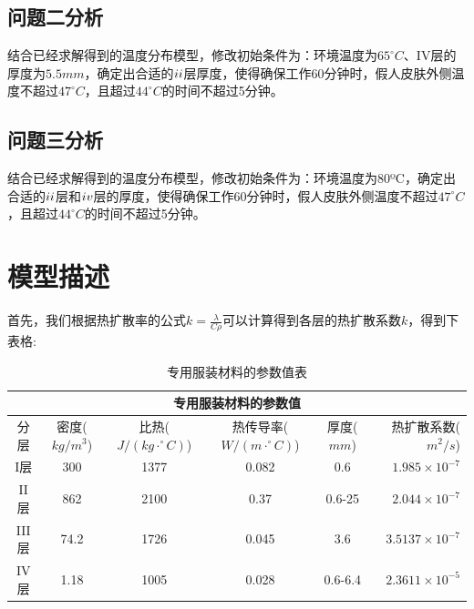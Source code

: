 \documentclass[bwprint]{cumcmthesis}
\begin{document}
    \subsection{问题二分析}
        \indent 结合已经求解得到的温度分布模型，修改初始条件为：环境温度为$65^{\circ}C$、IV层的厚度为$5.5mm$，确定出合适的$\uppercase\expandafter{\romannumeral2}$层厚度，使得确保工作60分钟时，假人皮肤外侧温度不超过$47^{\circ}C$，且超过$44^{\circ}C$的时间不超过5分钟。
    \subsection{问题三分析}
        \indent 结合已经求解得到的温度分布模型，修改初始条件为：环境温度为80ºC，确定出合适的$\uppercase\expandafter{\romannumeral2}$层和$\uppercase\expandafter{\romannumeral4}$层的厚度，使得确保工作60分钟时，假人皮肤外侧温度不超过$47^{\circ}C$，且超过$44^{\circ}C$的时间不超过5分钟。

\newpage

\section{模型描述}
    \indent 首先，我们根据热扩散率的公式$k=\frac{\lambda}{C\rho}$可以计算得到各层的热扩散系数$k$，得到下表格:\\
\begin{table}[htbp]
    \centering
      \begin{tabular}{|c|c|c|c|c|r|}
      \hline
      \multicolumn{6}{|c|}{专用服装材料的参数值} \bigstrut\\
      \hline
      分层   & \multicolumn{1}{p{5em}|}{密度\newline{}($kg/m^{3}$)} & \multicolumn{1}{p{5em}|}{比热\newline{}($J/(kg\cdot^{\circ}C)$)} & \multicolumn{1}{p{5em}|}{热传导率\newline{}($W/(m\cdot^{\circ}C)$)} & \multicolumn{1}{p{5em}|}{厚度\newline{}($mm$)} & \multicolumn{1}{p{5em}|}{热扩散系数($m^{2}/s$)} \bigstrut\\
      \hline
      I层    & 300   & 1377  & 0.082 & 0.6   & $1.985\times10^{-7}$ \bigstrut\\
      \hline
      II层   & 862   & 2100  & 0.37  & 0.6-25 & $2.044\times10^{-7}$ \bigstrut\\
      \hline
      III层  & 74.2  & 1726  & 0.045 & 3.6   & $3.5137\times10^{-7}$ \bigstrut\\
      \hline
      IV层   & 1.18  & 1005  & 0.028 & 0.6-6.4 & $2.3611\times10^{-5}$ \bigstrut\\
      \hline
      \end{tabular}%
      \caption{专用服装材料的参数值表}
    \label{tab:addlabel}%
  \end{table}%
\end{document}
